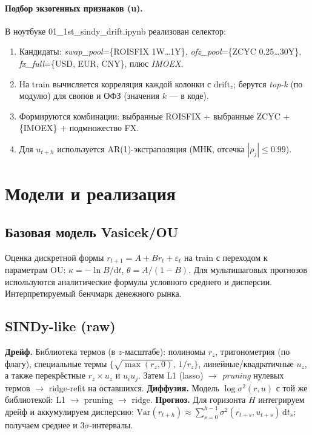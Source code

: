 \documentclass[14pt]{extarticle}
\begin{document}
\paragraph{Подбор экзогенных признаков (u).}
В ноутбуке {01\_1st\_sindy\_drift.ipynb} реализован селектор:
\begin{enumerate}
  \item Кандидаты: \textit{swap\_pool}=\{ROISFIX 1W…1Y\}, \textit{ofz\_pool}=\{ZCYC 0.25…30Y\}, \textit{fx\_full}=\{USD, EUR, CNY\}, плюс \textit{IMOEX}.
  \item На {train} вычисляется корреляция каждой колонки с $\mathrm{drift}_z$; берутся \emph{top-k} (по модулю) для свопов и ОФЗ (значения $k$ — в коде).
  \item Формируются комбинации: выбранные ROISFIX + выбранные ZCYC + \{IMOEX\} + подмножество FX.
  \item Для $u_{t+h}$ используется AR(1)-экстраполяция (МНК, отсечка $|\rho_j|\le 0.99$).
\end{enumerate}

\section{Модели и реализация}
\subsection*{Базовая модель Vasicek/OU}
Оценка дискретной формы $r_{t+1}=A+B r_t+\varepsilon_t$ на {train} с переходом к параметрам OU: $\kappa=-\ln B/\mathrm{d}t$, $\theta=A/(1-B)$. Для мультишаговых прогнозов используются аналитические формулы условного среднего и дисперсии. Интерпретируемый бенчмарк денежного рынка.

\subsection*{SINDy-like (raw)}
\textbf{Дрейф.} Библиотека термов (в $z$-масштабе): полиномы $r_z$, тригонометрия (по флагу), специальные термы $\{\sqrt{\max(r_z,0)},\,1/r_z\}$, линейные/квадратичные $u_z$, а также перекрёстные $r_z\!\times\!u_z$ и $u_i u_j$. Затем L1 ({lasso}) $\to$ \emph{pruning} нулевых термов $\to$ ridge-refit на оставшихся.
\textbf{Диффузия.} Модель $\log\sigma^2(r,u)$ с той же библиотекой: L1 $\to$ pruning $\to$ ridge. 
\textbf{Прогноз.} Для горизонта $H$ интегрируем дрейф и аккумулируем дисперсию:
$\mathrm{Var}(r_{t+h})\approx\sum_{s=0}^{h-1}\sigma^2(r_{t+s},u_{t+s})\,\mathrm{d}t_s$; получаем среднее и $3\sigma$-интервалы.
\end{document}
